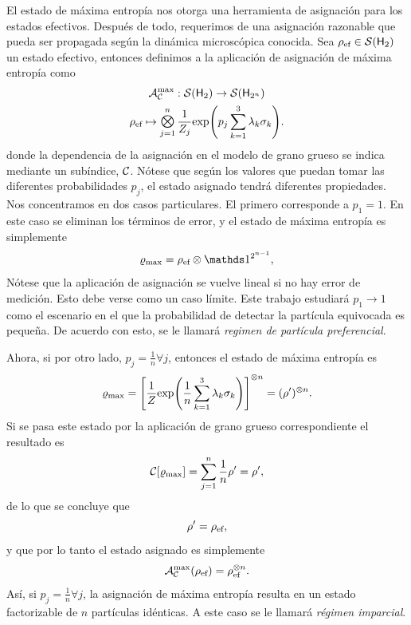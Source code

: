 El estado de máxima entropía nos otorga una herramienta de asignación para los estados efectivos. Después de todo, requerimos de una asignación razonable que pueda ser propagada según la dinámica microscópica conocida. Sea $\rho_{\text{ef}}\in\mathcal{S}({\sf H}_{2})$ un estado efectivo, entonces definimos a la aplicación de asignación de máxima entropía como
\begin{equation}\label{eq:MaxEntAss}
    \begin{gathered}
        \mcA_{\mcC}^{\max}:\densityspace{2}\rightarrow\densityspace{2^{n}}\nonumber\\
        \rho_{\ef} \mapsto \Motimes_{j=1}^{n}\frac{1}{Z_{j}}\text{exp}\qty(p_{j}\sum_{k=1}^{3}\lambda_{k}\sigma_{k}).
    \end{gathered}
\end{equation}
donde la dependencia de la asignación en el modelo de grano grueso se indica mediante un subíndice, $\mathcal{C}$. Nótese que según los valores que puedan tomar las diferentes probabilidades $p_{j}$, el estado asignado tendrá diferentes propiedades. Nos concentramos en dos casos particulares. El primero corresponde a $p_{1}=1$. En este caso se eliminan los términos de error, y el estado de máxima entropía es simplemente
\begin{equation}\label{eq:PreferentialAss}
    \varrho_{\max}=\rho_{\ef}\otimes\Id^{2^{n-1}},
\end{equation}
Nótese que la aplicación de asignación se vuelve lineal si no hay error de medición. Esto debe verse como un caso límite. Este trabajo estudiará $p_{1}\rightarrow 1$ como el escenario en el que la probabilidad de detectar la partícula equivocada es pequeña. De acuerdo con esto, se le llamará  \textit{regimen de partícula preferencial}.

Ahora, si por otro lado, $p_{j}=\frac{1}{n}\forall j$, entonces el estado de máxima entropía es
\begin{equation}
    \varrho_{\max}=\qty[\frac{1}{Z}\text{exp}\qty(\frac{1}{n}\sum_{k=1}^{3}\lambda_{k}\sigma_{k})]^{\otimes n}=(\rho')^{\otimes n}.\nonumber
\end{equation}
Si se pasa este estado por la aplicación de grano grueso correspondiente el resultado es 
\begin{equation}
    \mathcal{C}[\varrho_{\max}]=\sum_{j=1}^{n}\frac{1}{n}\rho'=\rho',\nonumber
\end{equation}
de  lo que se concluye que
\begin{equation*}
    \rho'=\rho_{\text{ef}},
\end{equation*}
y que por lo tanto el estado asignado es simplemente
\begin{equation}\label{eq:BoltzmannAss}
    \mathcal{A}_{\mathcal{C}}^{\max}(\rho_{\text{ef}})=\rho_{\text{ef}}^{\otimes n}.
\end{equation}
Así, si $p_{j}=\frac{1}{n}\forall j$, la asignación de máxima entropía resulta en un estado factorizable de $n$ partículas idénticas. A este caso se le llamará \textit{régimen imparcial}.



